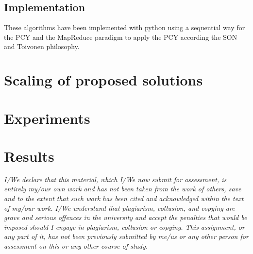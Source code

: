 \documentclass[14pt]{extarticle}
\begin{document}
\subsection{Implementation}
These algorithms have been implemented with python using a sequential way for the PCY and the MapReduce paradigm to apply the PCY according the SON and Toivonen philosophy.


\section{Scaling of proposed solutions}
\section{Experiments}
\section{Results}
{\it I/We declare that this material, which I/We now submit for assessment, is entirely my/our own work and has not been taken from the work of others, save and to the extent that such work has been cited and acknowledged within the text of my/our work. I/We understand that plagiarism, collusion, and copying are grave and serious offences in the university and accept the penalties that would be imposed should I engage in plagiarism, collusion or copying. This assignment, or any part of it, has not been previously submitted by me/us or any other person for assessment on this or any other course of study.}

\begin{comment}
The report should contain the following information:

-the chosen dataset, and the parts of the latter which have been considered,
-how data have been organized,
-the applied pre-processing techniques,
-the considered algorithms and their implementations,
-how the proposed solution scales up with data size,
-a description of the experiments,
-comments and discussion on the experimental results.

\end{comment}
\end{document}
